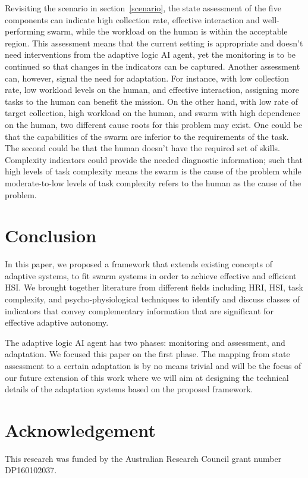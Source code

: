 \documentclass[journal]{IEEEtran}
\begin{document}
Revisiting the scenario in section~\ref{scenario}, the state assessment of the five components can indicate high collection rate, effective interaction and well-performing swarm, while the workload on the human is within the acceptable region. 
This assessment means that the current setting is appropriate and doesn\textquoteright t need interventions from the adaptive logic AI agent, yet the monitoring is to be continued so that changes in the indicators can be captured. 
Another assessment can, however, signal the need for adaptation. 
For instance, with low collection rate, low workload levels on the human, and effective interaction, assigning more tasks to the human can benefit the mission. 
On the other hand, with low rate of target collection, high workload on the human, and swarm with high dependence on the human, two different cause roots for this problem may exist.
One could be that the capabilities of the swarm  are inferior to the requirements of the task.
The second could be that the human doesn\textquoteright t have the required set of skills. 
Complexity indicators could provide the needed diagnostic information; such that high levels of task complexity means the swarm is the cause of the problem while moderate-to-low levels of task complexity refers to the human as the cause of the problem.

\section{Conclusion}\label{conclusion}
In this paper, we proposed a framework that extends existing concepts of adaptive systems, to fit swarm systems in order to achieve effective and efficient HSI. We brought together literature from different fields including HRI, HSI, task complexity, and psycho-physiological techniques to identify and discuss classes of indicators that convey complementary information that are significant for effective adaptive autonomy.

The adaptive logic AI agent has two phases: monitoring and assessment, and adaptation.
We focused this paper on the first phase. 
The mapping from state assessment to a certain adaptation is by no means trivial and will be the focus of our future extension of this work where we will aim at designing the technical details of the adaptation systems based on the proposed framework. 
 
\section*{Acknowledgement}
This research was funded by the Australian Research Council grant number DP160102037.
\end{document}
